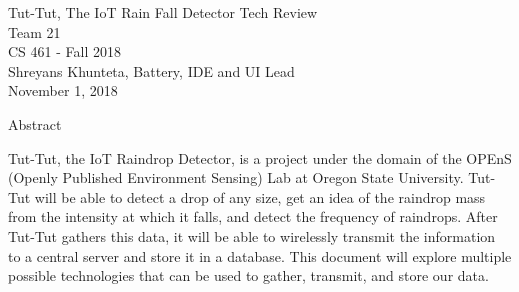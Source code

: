 \documentclass[letterpaper,10pt,draftclsnofoot,onecolumn]{article}
\begin{document}



\begin{titlepage}
\vspace*{\fill}
\begin{center}
{\Large Tut-Tut, The IoT Rain Fall Detector Tech Review}
\\[0.3cm]

{\large Team 21}
\\[0.3cm]

{\large CS 461 - Fall 2018}
\\[0.3cm]

{\large Shreyans Khunteta, Battery, IDE and UI Lead}
\\[0.3cm]

{\large November 1, 2018}
\\[1cm]

\begin{center}
    
{\Large Abstract}
\end{center}

Tut-Tut, the IoT Raindrop Detector, is a project under the domain of the OPEnS (Openly Published Environment Sensing) Lab at Oregon State University. Tut-Tut will be able to detect a drop of any size, get an idea of the raindrop mass from the intensity at which it falls, and detect the frequency of raindrops. After Tut-Tut gathers this data, it will be able to wirelessly transmit the information to a central server and store it in a database. This document will explore multiple possible technologies that can be used to gather, transmit, and store our data.
\vspace*{\fill}

\end{center}
\vspace*{\fill}
\end{titlepage}
\end{document}
